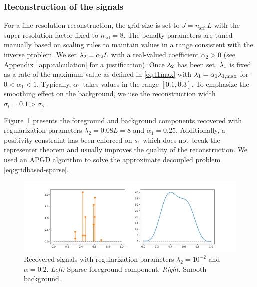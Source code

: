         \subsubsection{Reconstruction of the signals}
        For a fine resolution reconstruction, the grid size is set to $J = n_\mathrm{srf} . L$ with the super-resolution factor fixed to $n_\mathrm{srf}=8$. The penalty parameters are tuned manually based on scaling rules to maintain values in a range consistent with the inverse problem. We set $\lambda_{2} = \alpha_2 L$ with a real-valued coefficient $\alpha_2 >0$ (see Appendix~\ref{app:calculation} for a justification).
        Once $\lambda_{2}$ has been set, $\lambda_{1}$ is fixed as a rate of the maximum value as defined in \eqref{eq:l1max} with $\lambda_{1} = \alpha_1 \lambda_{1, \mathrm{max}}$ for $0 < \alpha_1 <1$. Typically, $\alpha_1$ takes values in the range $[0.1, 0.3]$. To emphasize the smoothing effect on the background, we use the reconstruction width $\sigma_t = 0.1 > \sigma_b$.

        Figure~\ref{fig:simple:recos} presents the foreground and background components recovered with regularization parameters $\lambda_2 = 0.08 L =8$ and $\alpha_1 = 0.25$. Additionally, a positivity constraint has been enforced on $s_1$ which does not break the representer theorem and usually improves the quality of the reconstruction. We used an APGD algorithm \cite{liang2022improving} to solve the approximate decoupled problem \eqref{eq:gridbased-sparse}.

        \begin{figure}[t]
            \centering
            \includegraphics[width=\linewidth]{figures/simple_reco/recos.pdf}        
            \caption{Recovered signals with regularization parameters $\lambda_2 = 10^{-2}$ and $\alpha = 0.2$. \textit{Left:} Sparse foreground component. \textit{Right:} Smooth background.}
            \label{fig:simple:recos}
        \end{figure}

